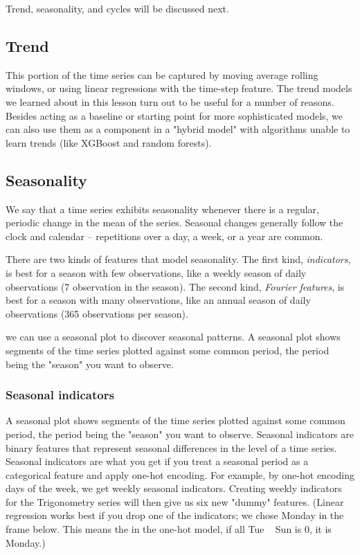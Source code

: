 \documentclass[12pt]{report}
\begin{document}
Trend, seasonality, and cycles will be discussed next.

\subsection{Trend}
This portion of the time series can be captured by moving average rolling windows, or using linear regressions with the time-step feature. The trend models we learned about in this lesson turn out to be useful for a number of reasons. Besides acting as a baseline or starting point for more sophisticated models, we can also use them as a component in a "hybrid model" with algorithms unable to learn trends (like XGBoost and random forests).

\subsection{Seasonality}
We say that a time series exhibits seasonality whenever there is a regular, periodic change in the mean of the series. Seasonal changes generally follow the clock and calendar -- repetitions over a day, a week, or a year are common.

There are two kinds of features that model seasonality. The first kind, \textit{indicators}, is best for a season with few observations, like a weekly season of daily observations (7 observation in the season). The second kind, \textit{Fourier features}, is best for a season with many observations, like an annual season of daily observations (365 observations per season).

we can use a seasonal plot to discover seasonal patterns. A seasonal plot shows segments of the time series plotted against some common period, the period being the "season" you want to observe.


\subsubsection{Seasonal indicators}
A seasonal plot shows segments of the time series plotted against some common period, the period being the "season" you want to observe. Seasonal indicators are binary features that represent seasonal differences in the level of a time series. Seasonal indicators are what you get if you treat a seasonal period as a categorical feature and apply one-hot encoding. For example, by one-hot encoding days of the week, we get weekly seasonal indicators. Creating weekly indicators for the Trigonometry series will then give us six new "dummy" features. (Linear regression works best if you drop one of the indicators; we chose Monday in the frame below. This means the in the one-hot model, if all Tue ~ Sun is 0, it is Monday.)
\end{document}

